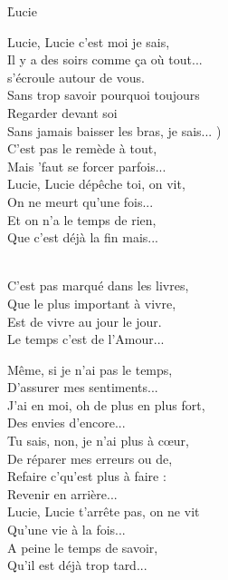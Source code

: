 \documentclass{novel}
\begin{document}
\newpage
\normalsize
\h*{Lucie}
\begin{multicols}{2}
Lucie, Lucie c'est moi je sais, \\
Il y a des soirs comme ça où tout... \\
s'écroule autour de vous. \\
Sans trop savoir pourquoi toujours \\

Regarder devant soi \\
Sans jamais baisser les bras, je sais... ) \\
C'est pas le remède à tout, \\
Mais 'faut se forcer parfois... \\

Lucie, Lucie dépêche toi, on vit, \\
On ne meurt qu'une fois... \\
Et on n'a le temps de rien, \\
Que c'est déjà la fin mais... \\

\begin{bfseries}
[Refrain:]\\
C'est pas marqué dans les livres, \\
Que le plus important à vivre, \\
Est de vivre au jour le jour. \\
Le temps c'est de l'Amour... \\
\end{bfseries}

Même, si je n'ai pas le temps, \\
D'assurer mes sentiments... \\
J'ai en moi, oh de plus en plus fort, \\
Des envies d'encore... \\

Tu sais, non, je n'ai plus à cœur, \\
De réparer mes erreurs ou de, \\
Refaire c'qu'est plus à faire : \\
Revenir en arrière... \\

Lucie, Lucie t'arrête pas, on ne vit \\
Qu'une vie à la fois... \\
A peine le temps de savoir, \\
Qu'il est déjà trop tard... \\


\end{multicols}
\end{document}
